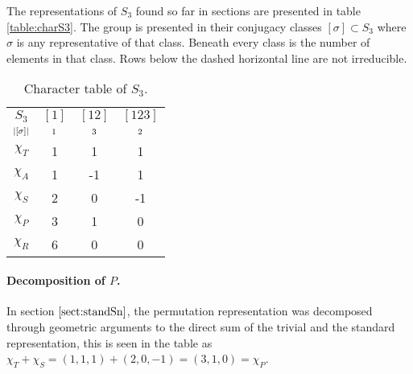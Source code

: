 \begin{example}
	The representations of $S_3$ found so far in sections 
	are presented in table \ref{table:charS3}. The group is presented in their conjugacy classes $[\sigma] \subset S_3$ where $\sigma$ is any representative of that class. Beneath every class is the number of elements in that class. Rows below the dashed horizontal line are not irreducible.
	
	\begin{table}[hbt!]
		\centering
		\begin{tabular}{c | c c c}
			$S_3$      & $[1]$   & $[12]$  & $[123]$ \\
			$\scriptstyle|[\sigma]|$ & $\scriptstyle 1$ & $\scriptstyle 3$ & $\scriptstyle 2$ \\ \hline
			$\chi_T$     & 1       & 1       & 1       \\
			$\chi_A$     & 1       & -1      & 1       \\
			$\chi_S$     & 2       & 0       & -1      \\ \hline\hline
			$\chi_P$     & 3       & 1       & 0       \\
			$\chi_R$     & 6       & 0       & 0
		\end{tabular}
		\caption{Character table of $S_3$.}
	\end{table}
	
	\paragraph{Decomposition of $P$.} In section $\ref{sect:standSn}$, the permutation representation was decomposed through geometric arguments to the direct sum of the trivial and the standard representation, this is seen in the table as $\chi_T + \chi_S = (1,1,1) + (2,0,-1) = (3,1,0) = \chi_P$.%
	

\end{example}
